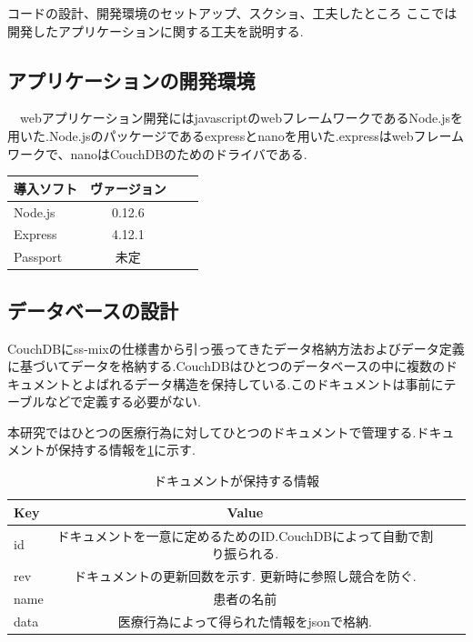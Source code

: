 コードの設計、開発環境のセットアップ、スクショ、工夫したところ
ここでは開発したアプリケーションに関する工夫を説明する.

\subsection{アプリケーションの開発環境}
　webアプリケーション開発にはjavascriptのwebフレームワークであるNode.jsを用いた.Node.jsのパッケージであるexpressとnanoを用いた.expressはwebフレームワークで、nanoはCouchDBのためのドライバである.

\begin{table}[htb]
	\begin{tabular}{|l|c|r|r|}\hline
	導入ソフト & ヴァージョン \\ \hline \hline
	Node.js & 0.12.6 \\ \hline
	Express & 4.12.1 \\ \hline
	Passport & 未定 \\ \hline
	\end{tabular}
\end{table}


\subsection{データベースの設計}
	CouchDBにss-mixの仕様書から引っ張ってきたデータ格納方法およびデータ定義\cite{bibi1}に基づいてデータを格納する.CouchDBはひとつのデータベースの中に複数のドキュメントとよばれるデータ構造を保持している.このドキュメントは事前にテーブルなどで定義する必要がない.
	
	本研究ではひとつの医療行為に対してひとつのドキュメントで管理する.ドキュメントが保持する情報を\ref{tab:doc}に示す.
	

\begin{table}[htb]
	\caption{ドキュメントが保持する情報}
	\begin{tabular}{|l|c|r|r|}\hline
	Key & Value \\ \hline \hline
	id &  ドキュメントを一意に定めるためのID.CouchDBによって自動で割り振られる.\\ \hline
	rev & ドキュメントの更新回数を示す. 更新時に参照し競合を防ぐ. \\ \hline
	name & 患者の名前 \\ \hline
	data & 医療行為によって得られた情報をjsonで格納. \\ \hline
	\end{tabular}
	\label{tab:doc}
\end{table}

